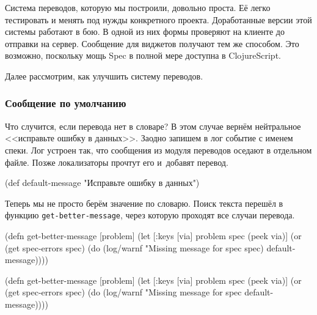 
Система переводов, которую мы построили, довольно проста. Её легко тестировать и
менять под нужды конкретного проекта. Доработанные версии этой системы работают
в бою. В одной из них формы проверяют на клиенте до отправки на
сервер. Сообщение для виджетов получают тем же способом. Это возможно, поскольку
мощь Spec в полной мере доступна в ClojureScript.

Далее рассмотрим, как улучшить систему переводов.

\subsubsection{Сообщение по умолчанию}

Что случится, если перевода нет в словаре? В этом случае вернём нейтральное
<<исправьте ошибку в данных>>. Заодно запишем в лог событие с именем спеки. Лог
устроен так, что сообщения из модуля переводов оседают в отдельном файле. Позже
локализаторы прочтут его и~добавят перевод.

  \begin{clojure}
(def default-message
  "Исправьте ошибку в данных")
  \end{clojure}

Теперь мы не просто берём значение по словарю. Поиск текста перешёл в функцию
\texttt{get-\-better-\-message}, через которую проходят все случаи перевода.

\ifx\DEVICETYPE\MOBILE

\begin{english}
  \begin{clojure}
(defn get-better-message [problem]
  (let [{:keys [via]} problem
        spec (peek via)]
    (or (get spec-errors spec)
        (do
          (log/warnf
            "Missing message for spec %
            spec)
          default-message))))
  \end{clojure}
\end{english}

\else

\begin{english}
  \begin{clojure}
(defn get-better-message [problem]
  (let [{:keys [via]} problem
        spec (peek via)]
    (or (get spec-errors spec)
        (do (log/warnf "Missing message for spec %
            default-message))))
  \end{clojure}
\end{english}

